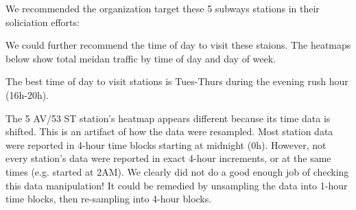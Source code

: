 \documentclass[11pt]{article}
\begin{document}
We recommended the organization target these 5 subways stations in their
soliciation efforts:

    

    We could further recommend the time of day to visit these staions. The
heatmaps below show total meidan traffic by time of day and day of week.

    

    The best time of day to visit stations is Tues-Thurs during the evening
rush hour (16h-20h).

The 5 AV/53 ST station's heatmap appears different because its time data
is shifted. This is an artifact of how the data were resampled. Most
station data were reported in 4-hour time blocks starting at midnight
(0h). However, not every station's data were reported in exact 4-hour
increments, or at the same times (e.g. started at 2AM). We clearly did
not do a good enough job of checking this data manipulation! It could be
remedied by unsampling the data into 1-hour time blocks, then
re-sampling into 4-hour blocks.


    
    
    
    
\end{document}
